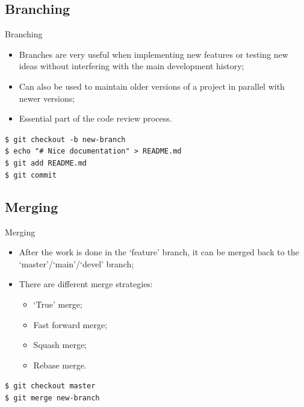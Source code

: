 \documentclass{beamer}
\begin{document}
\subsection{Branching}
\begin{frame}{Branching}
  \begin{itemize}
    \item Branches are very useful when implementing new features or testing new ideas without interfering with the main development history;
    \item Can also be used to maintain older versions of a project in parallel with newer versions;
    \item Essential part of the code review process.
  \end{itemize}
  \begin{block}{}
    \texttt{\$ git checkout -b new-branch} \\
    \texttt{\$ echo "\# Nice documentation" > README.md} \\
    \texttt{\$ git add README.md} \\
    \texttt{\$ git commit}
  \end{block}
\end{frame}

\subsection{Merging}
\begin{frame}{Merging}
  \begin{itemize}
    \item After the work is done in the `feature' branch, it can be merged back to the `master'/`main'/`devel' branch;
    \item There are different merge strategies:
    \begin{itemize}
      \item `True' merge;
      \item Fast forward merge;
      \item Squash merge;
      \item Rebase merge.
    \end{itemize}
  \end{itemize}
  \begin{block}{}
    \texttt{\$ git checkout master} \\
    \texttt{\$ git merge new-branch}
  \end{block}
\end{frame}
\end{document}
